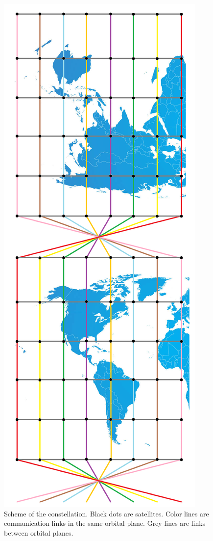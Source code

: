 \begin{figure}[H]
\centering
\includegraphics[scale=0.3]{network.png}
\caption[Shceme of the constellation]{Scheme of the constellation. Black dots are satellites. Color lines are communication links in the same orbital plane. Grey lines are links between orbital planes.}
\label{Scheme of the constellation}
\end{figure}